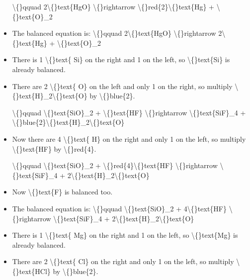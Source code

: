 \documentclass{article}
\begin{document}
\begin{itemize}
                    \textbackslash\{\}qquad
                        2\textbackslash\{\}text\{HgO\} \textbackslash\{\}rightarrow \textbackslash\{\}red\{2\}\textbackslash\{\}text\{Hg\} + \textbackslash\{\}text\{O\}\_2
  \item The balanced equation is:
                    \textbackslash\{\}qquad
                        2\textbackslash\{\}text\{HgO\} \textbackslash\{\}rightarrow 2\textbackslash\{\}text\{Hg\} + \textbackslash\{\}text\{O\}\_2
  \item There is 1 \textbackslash\{\}text\{ Si\} on the right and
                    1 on the left, so \textbackslash\{\}text\{Si\}
                    is already balanced.
  \item There are 2 \textbackslash\{\}text\{ O\} on the left and
                        only 1 on the right, so multiply
                        \textbackslash\{\}text\{H\}\_2\textbackslash\{\}text\{O\} by \textbackslash\{\}blue\{2\}.
                    
                    \textbackslash\{\}qquad
                        \textbackslash\{\}text\{SiO\}\_2 + \textbackslash\{\}text\{HF\} \textbackslash\{\}rightarrow \textbackslash\{\}text\{SiF\}\_4 + \textbackslash\{\}blue\{2\}\textbackslash\{\}text\{H\}\_2\textbackslash\{\}text\{O\}
  \item Now there are 4 \textbackslash\{\}text\{ H\} on the right and
                        only 1 on the left, so multiply
                        \textbackslash\{\}text\{HF\} by \textbackslash\{\}red\{4\}.
                    
                    \textbackslash\{\}qquad
                        \textbackslash\{\}text\{SiO\}\_2 + \textbackslash\{\}red\{4\}\textbackslash\{\}text\{HF\} \textbackslash\{\}rightarrow \textbackslash\{\}text\{SiF\}\_4 + 2\textbackslash\{\}text\{H\}\_2\textbackslash\{\}text\{O\}
  \item Now \textbackslash\{\}text\{F\} is balanced too.
  \item The balanced equation is:
                    \textbackslash\{\}qquad
                        \textbackslash\{\}text\{SiO\}\_2 + 4\textbackslash\{\}text\{HF\} \textbackslash\{\}rightarrow \textbackslash\{\}text\{SiF\}\_4 + 2\textbackslash\{\}text\{H\}\_2\textbackslash\{\}text\{O\}
  \item There is 1 \textbackslash\{\}text\{ Mg\} on the right and
                    1 on the left, so \textbackslash\{\}text\{Mg\}
                    is already balanced.
  \item There are 2 \textbackslash\{\}text\{ Cl\} on the right and
                        only 1 on the left, so multiply
                        \textbackslash\{\}text\{HCl\} by \textbackslash\{\}blue\{2\}.
                    

\end{itemize}
\end{document}

